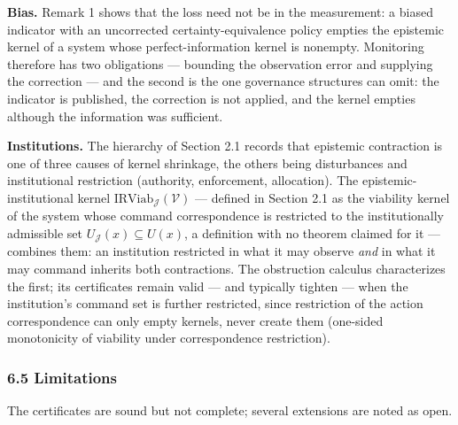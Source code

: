 \documentclass[11pt]{article}
\begin{document}
\textbf{Bias.} Remark 1 shows that the loss need not be in the
measurement: a biased indicator with an uncorrected
certainty-equivalence policy empties the epistemic kernel of a system
whose perfect-information kernel is nonempty. Monitoring therefore has
two obligations --- bounding the observation error and supplying the
correction --- and the second is the one governance structures can omit: the indicator is published, the correction is not applied,
and the kernel empties although the information was sufficient.

\textbf{Institutions.} The hierarchy of Section 2.1 records that
epistemic contraction is one of three causes of kernel shrinkage, the
others being disturbances and institutional restriction (authority,
enforcement, allocation). The epistemic-institutional kernel
\(\mathrm{IRViab}_{\mathcal{J}}(\mathcal{V})\) --- defined in Section 2.1 as the viability kernel of the system whose command correspondence is restricted to the institutionally admissible set \(U_{\mathcal{J}}(x) \subseteq U(x)\), a definition with no theorem claimed for it --- combines them: an institution restricted in what it
may observe \emph{and} in what it may command inherits both
contractions. The obstruction calculus characterizes the first; its
certificates remain valid --- and typically tighten --- when the
institution's command set is further restricted, since restriction of
the action correspondence can only empty kernels, never create them
(one-sided monotonicity of viability under correspondence restriction).

\subsubsection{6.5 Limitations}\label{limitations}

The certificates are sound but not complete; several extensions are noted as open.
\end{document}
